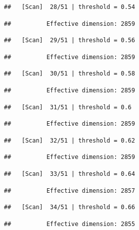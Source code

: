 \documentclass[
]{book}
\begin{document}
\begin{verbatim}
##   [Scan]  28/51 | threshold = 0.54
\end{verbatim}

\begin{verbatim}
##          Effective dimension: 2859
\end{verbatim}

\begin{verbatim}
##   [Scan]  29/51 | threshold = 0.56
\end{verbatim}

\begin{verbatim}
##          Effective dimension: 2859
\end{verbatim}

\begin{verbatim}
##   [Scan]  30/51 | threshold = 0.58
\end{verbatim}

\begin{verbatim}
##          Effective dimension: 2859
\end{verbatim}

\begin{verbatim}
##   [Scan]  31/51 | threshold = 0.6
\end{verbatim}

\begin{verbatim}
##          Effective dimension: 2859
\end{verbatim}

\begin{verbatim}
##   [Scan]  32/51 | threshold = 0.62
\end{verbatim}

\begin{verbatim}
##          Effective dimension: 2859
\end{verbatim}

\begin{verbatim}
##   [Scan]  33/51 | threshold = 0.64
\end{verbatim}

\begin{verbatim}
##          Effective dimension: 2857
\end{verbatim}

\begin{verbatim}
##   [Scan]  34/51 | threshold = 0.66
\end{verbatim}

\begin{verbatim}
##          Effective dimension: 2855
\end{verbatim}
\end{document}
